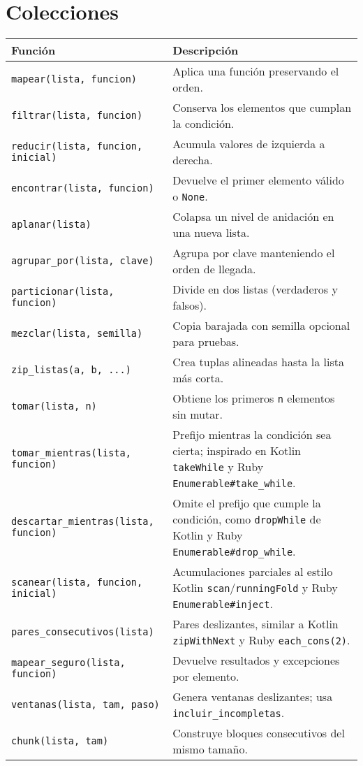 \documentclass{article}
\begin{document}
\section*{Colecciones}
\begin{tabular}{ll}
\textbf{Función} & \textbf{Descripción}\\\hline
\texttt{mapear(lista, funcion)} & Aplica una función preservando el orden.\\
\texttt{filtrar(lista, funcion)} & Conserva los elementos que cumplan la condición.\\
\texttt{reducir(lista, funcion, inicial)} & Acumula valores de izquierda a derecha.\\
\texttt{encontrar(lista, funcion)} & Devuelve el primer elemento válido o \texttt{None}.\\
\texttt{aplanar(lista)} & Colapsa un nivel de anidación en una nueva lista.\\
\texttt{agrupar\_por(lista, clave)} & Agrupa por clave manteniendo el orden de llegada.\\
\texttt{particionar(lista, funcion)} & Divide en dos listas (verdaderos y falsos).\\
\texttt{mezclar(lista, semilla)} & Copia barajada con semilla opcional para pruebas.\\
\texttt{zip\_listas(a, b, ...)} & Crea tuplas alineadas hasta la lista más corta.\\
\texttt{tomar(lista, n)} & Obtiene los primeros \texttt{n} elementos sin mutar.\\
\texttt{tomar\_mientras(lista, funcion)} & Prefijo mientras la condición sea cierta; inspirado en Kotlin \texttt{takeWhile} y Ruby \texttt{Enumerable\#take\_while}.\\
\texttt{descartar\_mientras(lista, funcion)} & Omite el prefijo que cumple la condición, como \texttt{dropWhile} de Kotlin y Ruby \texttt{Enumerable\#drop\_while}.\\
\texttt{scanear(lista, funcion, inicial)} & Acumulaciones parciales al estilo Kotlin \texttt{scan}/\texttt{runningFold} y Ruby \texttt{Enumerable\#inject}.\\
\texttt{pares\_consecutivos(lista)} & Pares deslizantes, similar a Kotlin \texttt{zipWithNext} y Ruby \texttt{each\_cons(2)}.\\
\texttt{mapear\_seguro(lista, funcion)} & Devuelve resultados y excepciones por elemento.\\
\texttt{ventanas(lista, tam, paso)} & Genera ventanas deslizantes; usa \texttt{incluir\_incompletas}.\\
\texttt{chunk(lista, tam)} & Construye bloques consecutivos del mismo tamaño.\\
\end{tabular}
\end{document}
